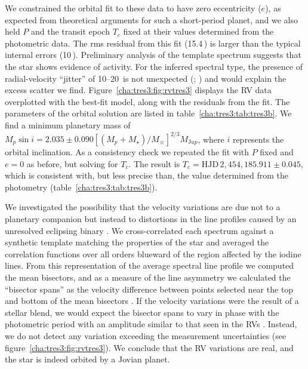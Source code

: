 We constrained the orbital fit to these data to have zero eccentricity ($e$), as expected from theoretical arguments for such a short-period planet, and we also held $P$ and the transit epoch $T_c$ fixed at their values determined from the photometric data.
The rms residual from this fit (15.4\,\ms) is larger than the typical internal errors (10\,\ms).
Preliminary analysis of the template spectrum suggests that the star shows evidence of activity.
For the inferred spectral type, the presence of radial-velocity ``jitter'' of \mbox{10--20\,\ms} is not unexpected (\citealp*{Saar_Butler_Marcy:apjl:1998a}; \citealp{Santos_Mayor_Naef:aa:2000a, Wright:pasp:2005a}) and would explain the excess scatter we find.
Figure~\ref{cha:tres3:fig:rvtres3} displays the RV data overplotted with the best-fit model, along with the residuals from the fit.
The parameters of the orbital solution are listed in table~\ref{cha:tres3:tab:tres3b}.
We find a minimum planetary mass of \mbox{$M_p \sin i = 2.035 \pm 0.090 [(M_p+M_{\star})/M_{\sun}]^{2/3} M_{\mathrm Jup}$}, where $i$ represents the orbital inclination.
As a consistency check we repeated the fit with $P$ fixed and $e = 0$ as before, but
solving for $T_c$.
The result is $T_c = \mathrm{HJD}\,2,\!454,\!185.911 \pm 0.045$, which is consistent with, but less precise than, the value determined from the photometry (table~\ref{cha:tres3:tab:tres3b}).

We investigated the possibility that the velocity variations are due not to a planetary companion but instead to distortions in the line profiles caused by an unresolved eclipsing binary \citep{Santos_Mayor_Naef:aa:2002a, Torres_Konacki_Sasselov:apj:2005a}.
We cross-correlated each spectrum against a synthetic template matching the properties of the star and averaged the correlation functions over all orders blueward of the region affected by the iodine lines.
From this representation of the average spectral line profile we computed the mean bisectors, and as a measure of the line asymmetry we calculated the ``bisector spans'' as the velocity difference between points selected near the top and bottom of the mean bisectors \citep{Torres_Konacki_Sasselov:apj:2005a}.
If the velocity variations were the result of a stellar blend, we would expect the bisector spans to vary in phase with the photometric period with an amplitude similar to that seen in the RVs \citep{Queloz_Henry_Sivan:aa:2001a, Mandushev_Torres_Latham:apj:2005a}.
Instead, we do not detect any variation exceeding the measurement uncertainties (see figure~\ref{cha:tres3:fig:rvtres3}).
We conclude that the RV variations are real, and the star is indeed orbited by a Jovian
planet.

